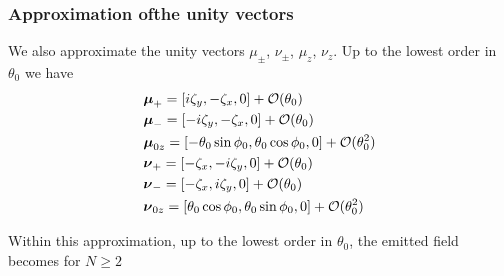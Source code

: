 \begin{enumerate}
\end{enumerate}

\subsubsection{Approximation ofthe unity vectors}

We also approximate the unity vectors $\mu_{\pm}$, $\nu_{\pm}$, $\mu_z$, $\nu_z$. Up to the lowest order in $\theta_0$ we have
\begin{align}
     & {\boldsymbol \mu}_+=[i\zeta_y,-\zeta_x,0]+{\cal O}(\theta_0)                           \\
     & {\boldsymbol \mu}_-=[-i\zeta_y,-\zeta_x,0]+{\cal O}(\theta_0)                          \\
     & {\boldsymbol \mu}_{0z}=[-\theta_0\sin\phi_0,\theta_0\cos\phi_0,0]+{\cal O}(\theta_0^2) \\
     & {\boldsymbol \nu}_+=[-\zeta_x,-i\zeta_y,0]+{\cal O}(\theta_0)                          \\
     & {\boldsymbol \nu}_-=[-\zeta_x,i\zeta_y,0]+{\cal O}(\theta_0)                           \\
     & {\boldsymbol \nu}_{0z}=[\theta_0\cos\phi_0,\theta_0\sin\phi_0,0]+{\cal O}(\theta_0^2)
\end{align}

Within this approximation, up to the lowest order in  $\theta_0$, the emitted field becomes for $N\ge2$

